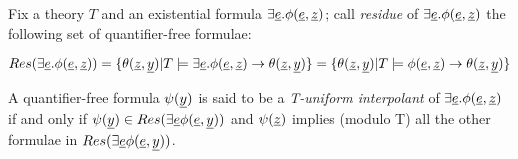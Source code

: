 \begin{definition}
  Fix a theory $T$ and an existential formula $\exists \underline{e} . \phi(\underline{e}, \underline{z})$; call \emph{residue} of $\exists \underline{e} . \phi(\underline{e}, \underline{z})$ the following set of
  quantifier-free formulae:

  \begin{equation*}
    Res(\exists \underline{e} . \phi(\underline{e}, \underline{z})) = \{ \theta(\underline{z}, \underline{y}) | T \models \exists \underline{e} . \phi(\underline{e}, \underline{z}) \rightarrow \theta(\underline{z}, \underline{y}) \} =\{ \theta(\underline{z}, \underline{y}) | T \models \phi(\underline{e}, \underline{z}) \rightarrow \theta(\underline{z}, \underline{y}) \}
  \end{equation*}

  A quantifier-free formula $\psi(\underline{y})$ is said to be a \emph{T-uniform interpolant} 
  of $\exists \underline{e} . \phi(\underline{e}, \underline{z})$ if and only if $\psi(\underline{y}) \in Res(\exists \underline{e} \phi(\underline{e}, \underline{y}))$ and 
  $\psi(\underline{z})$ implies (modulo T)
  all the other formulae in $Res(\exists \underline{e} \phi(\underline{e}, \underline{y}))$.

\end{definition}

